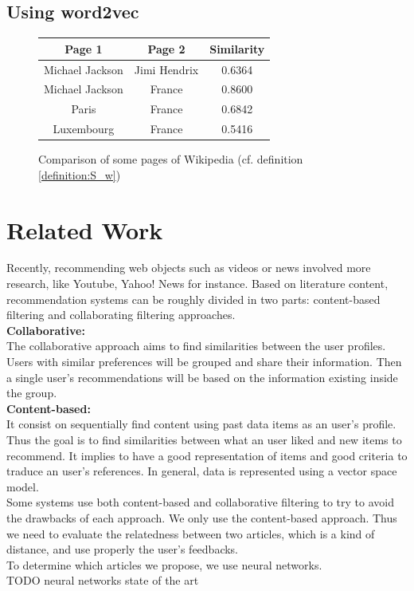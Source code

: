 \documentclass[11pt]{article}
\theoremstyle{plain}
\theoremstyle{definition}
\theoremstyle{remark}
\begin{document}
\subsection{Using word2vec}


\begin{figure}[hb]
    \caption{Comparison of some pages of Wikipedia (cf. definition \ref{definition:S_w})}
    \label{fig:similarity}
	\centering
	\begin{tabular}{c|c|c}
		Page 1			&	Page 2			&	Similarity \\
		\hline\hline
		Michael Jackson	&	Jimi Hendrix	&	0.6364	\\
		Michael Jackson	&	France			&	0.8600	\\
		Paris			&	France			&	0.6842	\\
		Luxembourg		&	France			&	0.5416	\\
  \end{tabular}
\end{figure}


\section{Related Work}
Recently, recommending web objects such as videos or news involved more research, like Youtube, Yahoo! News for instance. Based on literature content, recommendation systems can be roughly divided in two parts: content-based filtering and collaborating filtering approaches.\\
\textbf{Collaborative: }\\
The collaborative approach aims to find similarities between the user profiles. Users with similar preferences will be grouped and share their information. Then a single user's recommendations will be based on the information existing inside the group.\\
\textbf{Content-based: }\\ 
It consist on sequentially find content using past data items as an user's profile. Thus the goal is to find similarities between what an user liked and new items to recommend. It implies to have a good representation of items and good criteria to traduce an user's references. In general, data is represented using a vector space model.\\
Some systems use both content-based and collaborative filtering to try to avoid the drawbacks of each approach. We only use the content-based approach. Thus we need to evaluate the relatedness between two articles, which is a kind of distance, and use properly the user's feedbacks.\\
To determine which articles we propose, we use neural networks.\\

TODO neural networks state of the art




\end{document}
